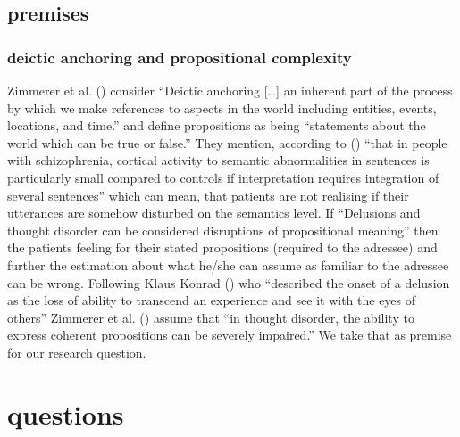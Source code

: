 \documentclass[12pt,a4paper]{article}
\begin{document}
\subsection{premises}\label{premises}

\subsubsection{deictic anchoring and propositional complexity}\label{deictic-anchoring-and-propositional-complexity}

Zimmerer et al. () consider
``Deictic anchoring {[}\ldots{]} an inherent part of the process by which we make references to aspects in the world including entities, events, locations, and time.'' and define propositions as being ``statements about the world which can be true or false.'' They mention, according to () ``that in people with schizophrenia, cortical activity to semantic abnormalities in sentences is particularly small compared to controls if interpretation requires integration of several sentences'' which can mean, that patients are not realising if their utterances are somehow disturbed on the semantics level.
If ``Delusions and thought disorder can be considered disruptions of propositional meaning'' then the patients feeling for their stated propositions (required to the adressee) and further the estimation about what he/she can assume as familiar to the adressee can be wrong. Following Klaus Konrad () who ``described the onset of a delusion as the loss of ability to transcend an experience and see it with the eyes of others'' Zimmerer et al. () assume that ``in thought disorder, the ability to express coherent propositions can be severely impaired.'' We take that as premise for our research question.

\section{questions}\label{questions}
\end{document}
